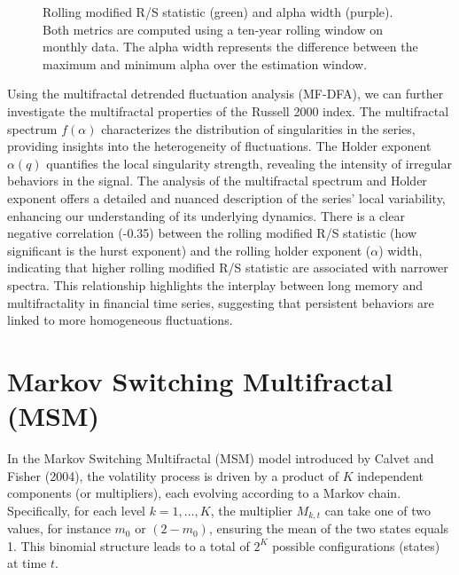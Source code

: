 \documentclass[11pt]{extarticle}
\begin{document}
\begin{figure}[ht]
    \caption{Rolling modified R/S statistic (green) and alpha width (purple). \\
Both metrics are computed using a ten-year rolling window on monthly data. The alpha width represents the difference between the maximum and minimum alpha over the estimation window.}
\end{figure}

\FloatBarrier

Using the multifractal detrended fluctuation analysis (MF-DFA), we can further investigate the multifractal properties of the Russell 2000 index.
The multifractal spectrum $f(\alpha)$ characterizes the distribution of singularities in the series, providing insights into the heterogeneity of fluctuations.
The Holder exponent $\alpha(q)$ quantifies the local singularity strength, revealing the intensity of irregular behaviors in the signal.
The analysis of the multifractal spectrum and Holder exponent offers a detailed and nuanced description of the series' local variability, enhancing our understanding of its underlying dynamics.
There is a clear negative correlation (-0.35) between the rolling modified R/S statistic (how significant is the hurst exponent) and the rolling holder exponent ($\alpha$) width, indicating that higher rolling modified R/S statistic are associated with narrower spectra.
This relationship highlights the interplay between long memory and multifractality in financial time series, suggesting that persistent behaviors are linked to more homogeneous fluctuations.


\section{Markov Switching Multifractal (MSM)}
\label{sec:msm}

In the Markov Switching Multifractal (MSM) model introduced by Calvet and Fisher (2004), the volatility process is driven by a product of $K$ independent components (or multipliers), each evolving according to a Markov chain. Specifically, for each level $k = 1, \ldots, K$, the multiplier $M_{k,t}$ can take one of two values, for instance $m_0$ or $(2 - m_0)$, ensuring the mean of the two states equals 1. This binomial structure leads to a total of $2^K$ possible configurations (states) at time $t$.
\end{document}
